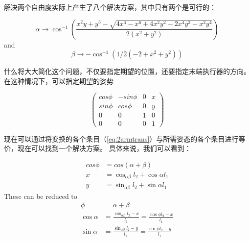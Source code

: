 

解决两个自由度实际上产生了八个解决方案，其中只有两个是可行的：

\begin{equation}
\alpha \rightarrow \cos^{-1}\left(\frac{x^2 y + y^3 - \sqrt{4 x^4 - x^6 + 4 x^2 y^2 - 2 x^4 y^2 - x^2 y^4}}{2 (x^2 + y^2)}\right)
\end{equation}
and
\begin{equation}
\beta \rightarrow -\cos^{-1}\left(1/2(-2+x^2+y^2)\right)
\end{equation}


什么将大大简化这个问题，不仅要指定期望的位置，还要指定末端执行器的方向。 在这种情况下，可以指定期望的姿势

\begin{equation}
\left(
\begin{array}{cccc}
cos\phi & -sin\phi & 0 & x\\
sin\phi & cos\phi & 0 & y\\
0 & 0 & 1 & 0\\
0 & 0 & 0 & 1
\end{array}
\right)
\end{equation}

现在可以通过将变换的各个条目（\ref {eq:2armtrans}）与所需姿态的各个条目进行等价，现在可以找到一个解决方案。 具体来说，我们可以看到：

\begin{eqnarray}
cos\phi &= cos(\alpha+\beta)\\
\nonumber
x &= \cos_{\alpha\beta}l_2+\cos\alpha l_1\\
\nonumber
y &= \sin_{\alpha\beta}l_2+\sin\alpha l_1
\end{eqnarray}
These can be reduced to
\begin{eqnarray}
\phi &= \alpha + \beta\\
\nonumber
\cos\alpha &= \frac{\cos_{\alpha\beta}l_2-x}{l_1}=\frac{\cos\phi l_2-x}{l_1}\\
\nonumber
\sin\alpha &= \frac{\sin_{\alpha\beta}l_2-y}{l_1}=\frac{\sin\phi l_2-y}{l_1}\\
\end{eqnarray}

